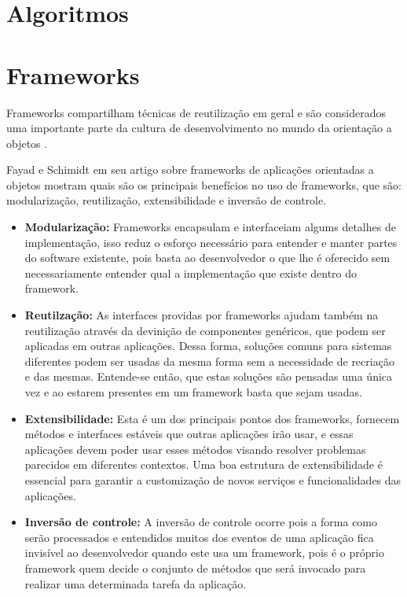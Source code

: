 \section{Algoritmos}

\section{Frameworks}

Frameworks compartilham técnicas de reutilização em geral e são considerados uma importante parte da cultura de desenvolvimento no mundo da orientação a objetos \cite{Johnson:1997}.

Fayad e Schimidt em seu artigo \cite{Fayad:Schimidt:1997} sobre frameworks de aplicações orientadas a objetos mostram quais são os principais benefícios no uso de frameworks, que são: modularização, reutilização, extensibilidade e inversão de controle.

\begin{itemize}
	\item \textbf{Modularização:} Frameworks encapsulam e interfaceiam algums detalhes de implementação, isso reduz o esforço necessário para entender e manter partes do software existente, pois basta ao desenvolvedor o que lhe é oferecido sem necessariamente entender qual a implementação que existe dentro do framework.

	\item \textbf{Reutilzação:} As interfaces providas por frameworks ajudam também na reutilização através da devinição de componentes genéricos, que podem ser aplicadas em outras aplicações. Dessa forma, soluções comuns para sistemas diferentes podem ser usadas da mesma forma sem a necessidade de recriação e das mesmas. Entende-se então, que estas soluções são pensadas uma única vez e ao estarem presentes em um framework basta que sejam usadas.

	\item \textbf{Extensibilidade:} Esta é um dos principais pontos dos frameworks, fornecem métodos e interfaces estáveis que outras aplicações irão usar, e essas aplicações devem poder usar esses métodos visando resolver problemas parecidos em diferentes contextos. Uma boa estrutura de extensibilidade é essencial para garantir a customização de novos serviços e funcionalidades das aplicações.

	\item \textbf{Inversão de controle:} A inversão de controle ocorre pois a forma como serão processados e entendidos muitos dos eventos de uma aplicação fica invisível ao desenvolvedor quando este usa um framework, pois é o próprio framework quem decide o conjunto de métodos que será invocado para realizar uma determinada tarefa da aplicação.
\end{itemize}

